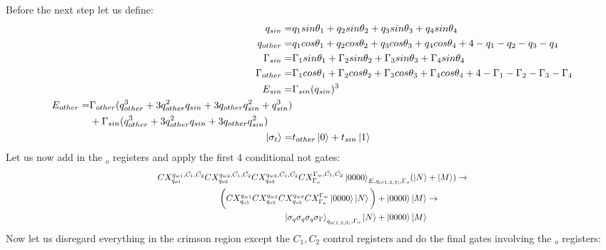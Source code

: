 \documentclass{article}
\begin{document}
Before the next step let us define:
\begin{align}
    q_{sin} =& q_1sin\theta_1+q_2sin\theta_2+q_3sin\theta_3+q_4sin\theta_4\\
    q_{other} =& q_1cos\theta_1+q_2cos\theta_2+q_3cos\theta_3+q_4cos\theta_4+4-q_1-q_2-q_3-q_4\\
    \Gamma_{sin} =& \Gamma_1sin\theta_1+\Gamma_2sin\theta_2+\Gamma_3sin\theta_3+\Gamma_4sin\theta_4\\
    \Gamma_{other} =& \Gamma_1cos\theta_1+\Gamma_2cos\theta_2+\Gamma_3cos\theta_3+\Gamma_4cos\theta_4+4-\Gamma_1-\Gamma_2-\Gamma_3-\Gamma_4\\
    E_{sin} =& \Gamma_{sin}(q_{sin})^3\\
    \begin{split}
        E_{other} = &\Gamma_{other}(q_{other}^3+3q_{other}^2q_{sin}+3q_{other}q_{sin}^2+q_{sin}^3)\\
        &+\Gamma_{sin}(q_{other}^3+3q_{other}^2q_{sin}+3q_{other}q_{sin}^2)
    \end{split}\\
    \ket{\sigma_t} = &t_{other}\ket{0}+t_{sin}\ket{1}\\
\end{align}
Let us now add in the $ _o$ registers and apply the first 4 conditional not gates:
\begin{equation}
   \resizebox{.9\hsize}{!}{$\begin{split}
        CX_{q_{o1}}^{q_{w1},\bar{C_1},\bar{C_2}}CX_{q_{o2}}^{q_{w2},\bar{C_1},\bar{C_2}}CX_{q_{o3}}^{q_{w3},\bar{C_1},\bar{C_2}}CX_{\Gamma_o}^{\Gamma_w,\bar{C_1},\bar{C_2}}
        \ket{0000}_{E,q_{o(1,2,3)},\Gamma_o}&(\ket{N}+\ket{M})\to\\
        \bigg(CX_{q_{o1}}^{q_{w1}}CX_{q_{o2}}^{q_{w2}}CX_{q_{o3}}^{q_{w3}}CX_{\Gamma_o}^{\Gamma_w}
        \ket{0000}\ket{N}\bigg)+\ket{0000}&\ket{M}\to\\
        \ket{\sigma_q\sigma_q\sigma_q\sigma_\Gamma}_{q_{o(1,2,3)},\Gamma_{o}}\ket{N}+\ket{0000}&\ket{M}\\
   \end{split}$}
\end{equation}
Now let us disregard everything in the crimson region except the $C_1,C_2$ control registers and do the final gates involving the $ _o$ registers:
\end{document}
